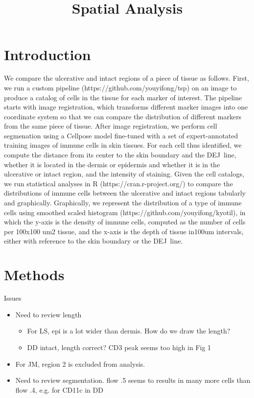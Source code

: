 \documentclass{article}
\begin{document}
\title{Spatial Analysis}
\author{}
\maketitle

\section{Introduction}

We compare the ulcerative and intact regions of a piece of tissue as
follows. First, we run a custom pipeline (https://github.com/youyifong/tsp)
on an image to produce a catalog of cells in the tissue for each marker of
interest. The pipeline starts with image registration, which transforms
different marker images into one coordinate system so that we can compare
the distribution of different markers from the same piece of tissue. After
image registration, we perform cell segmenation using a Cellpose model
fine-tuned with a set of expert-annotated training images of immune cells in
skin tissues. For each cell thus identified, we compute the distance from
its center to the skin boundary and the DEJ\ line, whether it is located in
the dermis or epidermis and whether it is in the ulcerative or intact
region, and the intensity of staining. Given the cell catalogs, we run
statistical analyses in R (https://cran.r-project.org/) to compare the
distributions of immune cells between the ulcerative and intact regions
tabularly and graphically. Graphically, we represent the distribution of a
type of immune cells using smoothed scaled histogram
(https://github.com/youyifong/kyotil), in which the y-axis is the density of
immune cells, computed as the number of cells per 100x100 um2 tissue, and
the x-axis is the depth of tissue in100um intervals, either with reference
to the skin boundary or the DEJ\ line.

\bigskip

\section{Methods}

\bigskip Issues

\begin{itemize}
\item Need to review length

\begin{itemize}
\item For LS, epi is a lot wider than dermis. How do we draw the length?

\item DD intact, length correct? CD3 peak seems too high in Fig 1
\end{itemize}

\item For JM, region 2 is excluded from analysis.

\item Need to review segmentation. flow .5 seems to results in many more
cells than flow .4, e.g. for CD11c in DD
\end{itemize}
\end{document}
